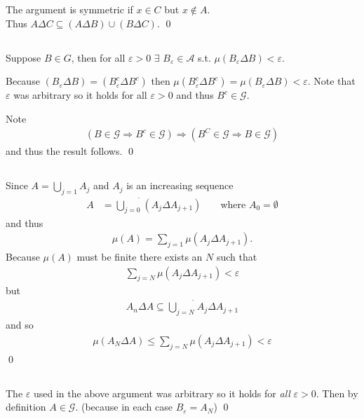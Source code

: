 \documentclass{unswmaths}
\begin{document}
The argument is symmetric if $ x \in C $ but $ x \not\in A $. \\
Thus $ A \Delta C \subseteq (A \Delta B) \cup ( B \Delta C) $. \qed

\subsection{}
Suppose $ B \in G $, then for all $ \varepsilon > 0 $ $ \exists $ $ B_\varepsilon \in \mathcal{A} $ s.t. $ \mu (B_\varepsilon \Delta B) < \varepsilon $.

Because $ (B_\varepsilon \Delta B ) = ( B^c_\varepsilon \Delta B^c ) $ then $ \mu( B^c_\varepsilon \Delta B^c ) = \mu(B_\varepsilon \Delta B )  < \varepsilon $.
Note that $ \varepsilon $ was arbitrary so it holds for all $ \varepsilon > 0 $ and thus $ B^c \in \mathcal{G} $. 

Note 
\begin{align*}
    \left( B \in \mathcal{G} \Longrightarrow B^c \in \mathcal{G} \right) \Longrightarrow \left( B^C \in \mathcal{G} \Longrightarrow B \in \mathcal{G} \right)
\end{align*}
and thus the result follows. \qed

\subsection{}
Since $ A = \bigcup_{j=1} A_j $ and $ A_j $ is an increasing sequence
\begin{align*}
    A &= \dot{\bigcup_{j=0}} (A_j \Delta A_{j+1} ) & & \text{ where } A_0 = \emptyset
\end{align*}
and thus
\begin{align*}
    \mu(A) = \sum_{j=1} \mu(A_j \Delta A_{j+1}).
\end{align*}
Because $ \mu(A) $ must be finite there exists an $ N $ such that 
\begin{align*}
    \sum_{j=N} \mu(A_j \Delta A_{j+1}) < \varepsilon
\end{align*}
but 
\begin{align*}
    A_{n} \Delta A \subseteq \dot{\bigcup_{j=N}} A_j \Delta A_{j+1}
\end{align*}
and so
\begin{align*}
    \mu(A_N \Delta A) \leq \sum_{j=N} \mu(A_j \Delta A_{j+1}) < \varepsilon
\end{align*}
\qed
\subsection{}
The $ \varepsilon $ used in the above argument was arbitrary so it holds for  \emph{all} $ \varepsilon > 0 $. Then by definition $ A \in \mathcal{G} $. (because in each case $ B_\varepsilon = A_N $)
\qed
\end{document}
